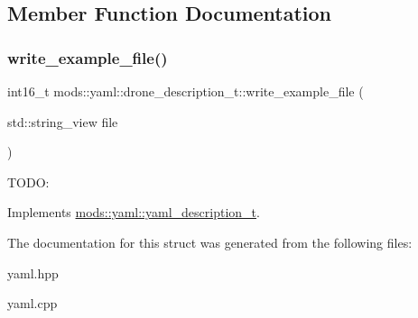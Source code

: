 \subsection{Member Function Documentation}
\mbox{\label{structmods_1_1yaml_1_1drone__description__t_a5ae795e47e4760c81d87143b615cfb84}} 
\subsubsection{\texorpdfstring{write\+\_\+example\+\_\+file()}{write\_example\_file()}}
{\footnotesize\ttfamily int16\+\_\+t mods\+::yaml\+::drone\+\_\+description\+\_\+t\+::write\+\_\+example\+\_\+file (\begin{DoxyParamCaption}\item[{std\+::string\+\_\+view}]{file }\end{DoxyParamCaption})\hspace{0.3cm}{\ttfamily [virtual]}}

T\+O\+DO\+: 

Implements \hyperlink{structmods_1_1yaml_1_1yaml__description__t}{mods\+::yaml\+::yaml\+\_\+description\+\_\+t}.



The documentation for this struct was generated from the following files\+:\begin{DoxyCompactItemize}
\item 
yaml.\+hpp\item 
yaml.\+cpp\end{DoxyCompactItemize}
